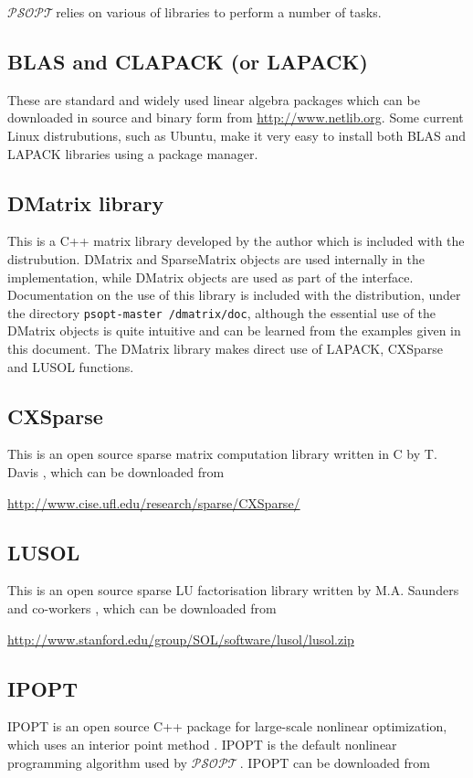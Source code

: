 \documentclass[a4paper,11pt]{report}    %
\newcommand{\psopt}{$\mathcal{PSOPT}$\,}  %
\newcommand{\basedir}{\texttt{psopt-master\,}}
\begin{document}
\psopt relies on various of libraries to perform a number of tasks. 

\subsection{BLAS and CLAPACK (or LAPACK)}
These are standard and widely used linear algebra packages which can be downloaded in source and binary form from \href{http://www.netlib.org}{http://www.netlib.org}. Some current Linux distrubutions, such as Ubuntu, make it very easy to install both BLAS and LAPACK libraries using a package manager.


\subsection{DMatrix library} 
This is a C++ matrix library  developed by the author which is included with the distrubution. 
DMatrix and SparseMatrix objects are used internally in the implementation, while DMatrix objects are used
as part of the interface. Documentation on the use of this library is included 
with the distribution, under the directory \basedir\texttt{/dmatrix/doc}, although the essential use of the DMatrix objects 
is quite intuitive and can be learned from the examples given in this document. The DMatrix library makes direct use
of LAPACK, CXSparse and LUSOL functions.

\subsection{CXSparse}
This is an open source sparse matrix computation library written in C by T. Davis \cite{Davis:06}, which can be downloaded from


\href{http://www.cise.ufl.edu/research/sparse/CXSparse/}{http://www.cise.ufl.edu/research/sparse/CXSparse/}

\subsection{LUSOL}
This is an open source sparse LU factorisation library written by M.A. Saunders and co-workers \cite{Gill:87}, which can be downloaded from


\href{http://www.stanford.edu/group/SOL/software/lusol/lusol.zip}{http://www.stanford.edu/group/SOL/software/lusol/lusol.zip}


\subsection{IPOPT}
IPOPT is an open source C++ package for large-scale nonlinear optimization, which uses an interior point method \cite{Wachter:06}. IPOPT is the default nonlinear programming algorithm used by \psopt.    IPOPT can be downloaded from 
\end{document}
